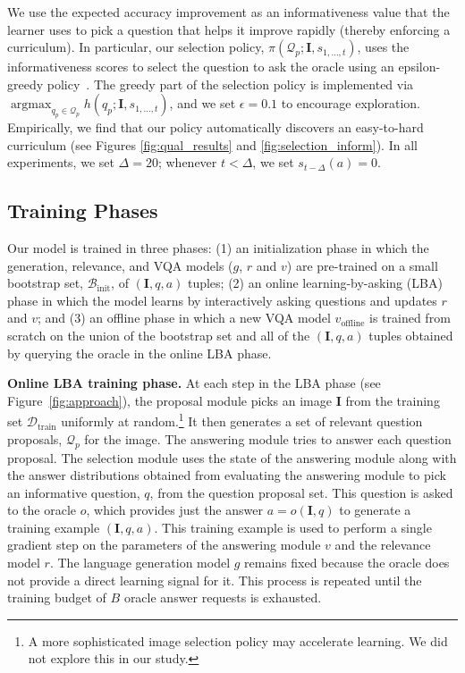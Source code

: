 \documentclass[10pt,twocolumn,letterpaper]{article}
\DeclareMathOperator*{\argmax}{argmax}
\newcommand{\image}{\mathbf{I}}
\newcommand{\imageQApair}{(\mathbf{I}, q, a)}
\newcommand{\voffline}{v_{\mathrm{offline}}}
\newcommand{\bootstrap}{\mathcal{B}_{\mathrm{init}}}
\newcommand{\trainset}{\mathcal{D}_\mathrm{train}}
\begin{document}
We use the expected accuracy improvement as an informativeness value that the learner uses to pick a question that helps it improve rapidly (thereby enforcing a curriculum). In particular, our selection policy, $\pi(\mathcal{Q}_p; \image, s_{1, \dots, t})$, uses the informativeness scores to select the question to ask the oracle using an epsilon-greedy policy~\citep{sutton1998reinforcement}. The greedy part of the selection policy is implemented via $\argmax_{q_p \in \mathcal{Q}_p} h(q_p; \image, s_{1, \dots, t})$, and we set $\epsilon \!=\! 0.1$ to encourage exploration. Empirically, we find that our policy automatically discovers an easy-to-hard curriculum (see Figures \ref{fig:qual_results} and \ref{fig:selection_inform}). In all experiments, we set $\Delta \!=\! 20$; whenever $t \!<\! \Delta$, we set $s_{t - \Delta}(a) \!=\! 0$.

\vspace{-0.05in}
\subsection{Training Phases}
\label{sec:training}
Our model is trained in three phases: (1) an initialization phase in which the generation, relevance, and VQA models ($g$, $r$ and $v$) are pre-trained on a small bootstrap set, $\bootstrap$, of $\imageQApair$ tuples; (2) an online learning-by-asking (LBA) phase in which the model learns by interactively asking questions and updates $r$ and $v$; and (3) an offline phase in which a new VQA model $\voffline$ is trained from scratch on the union of the bootstrap set and all of the $\imageQApair$ tuples obtained by querying the oracle in the online LBA phase.

\par \noindent \textbf{Online LBA training phase.} At each step in the LBA phase (see Figure~\ref{fig:approach}), the proposal module picks an image $\image$ from the training set $\trainset$ uniformly at random.\footnote{A more sophisticated image selection policy may accelerate learning. We did not explore this in our study.}
It then generates a set of relevant question proposals, $\mathcal{Q}_p$ for the image. The answering module tries to answer each question proposal. The selection module uses the state of the answering module along with the answer distributions obtained from evaluating the answering module to pick an informative question, $q$, from the question proposal set. This question is asked to the oracle $o$, which provides just the answer $a = o(\image, q)$ to generate a training example $\imageQApair$. This training example is used to perform a single gradient step on the parameters of the answering module $v$ and the relevance model $r$. The language generation model $g$ remains fixed because the oracle does not provide a direct learning signal for it. This process is repeated until the training budget of $B$ oracle answer requests is exhausted.
\end{document}
